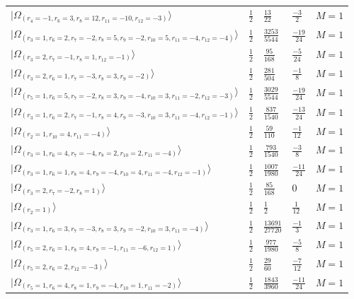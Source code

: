 \documentclass[11pt,twoside,openright]{book}
\begin{document}
\begin{longtable}{p{4cm}llll}
$|\Omega_{(r_{4}=-1, r_{6}=3, r_{8}=12, r_{11}=-10, r_{12}=-3)}\rangle$ & $\frac{1}{2}$ & $\frac{13}{22}$ & $\frac{-3}{2}$ & $M=1$ \\
$|\Omega_{(r_{3}=1, r_{6}=2, r_{7}=-2, r_{8}=5, r_{9}=-2, r_{10}=5, r_{11}=-4, r_{12}=-4)}\rangle$ & $\frac{1}{2}$ & $\frac{3253}{5544}$ & $\frac{-19}{24}$ & $M=1$ \\
$|\Omega_{(r_{3}=2, r_{7}=-1, r_{8}=1, r_{12}=-1)}\rangle$ & $\frac{1}{2}$ & $\frac{95}{168}$ & $\frac{-5}{24}$ & $M=1$ \\
$|\Omega_{(r_{3}=2, r_{6}=1, r_{7}=-3, r_{8}=3, r_{9}=-2)}\rangle$ & $\frac{1}{2}$ & $\frac{281}{504}$ & $\frac{-1}{8}$ & $M=1$ \\
$|\Omega_{(r_{5}=1, r_{6}=5, r_{7}=-2, r_{8}=3, r_{9}=-4, r_{10}=3, r_{11}=-2, r_{12}=-3)}\rangle$ & $\frac{1}{2}$ & $\frac{3029}{5544}$ & $\frac{-19}{24}$ & $M=1$ \\
$|\Omega_{(r_{3}=1, r_{6}=2, r_{7}=-1, r_{8}=4, r_{9}=-3, r_{10}=3, r_{11}=-4, r_{12}=-1)}\rangle$ & $\frac{1}{2}$ & $\frac{837}{1540}$ & $\frac{-13}{24}$ & $M=1$ \\
$|\Omega_{(r_{2}=1, r_{10}=4, r_{11}=-4)}\rangle$ & $\frac{1}{2}$ & $\frac{59}{110}$ & $\frac{-1}{12}$ & $M=1$ \\
$|\Omega_{(r_{3}=1, r_{6}=4, r_{7}=-4, r_{8}=2, r_{10}=2, r_{11}=-4)}\rangle$ & $\frac{1}{2}$ & $\frac{793}{1540}$ & $\frac{-3}{8}$ & $M=1$ \\
$|\Omega_{(r_{3}=1, r_{6}=1, r_{8}=4, r_{9}=-4, r_{10}=4, r_{11}=-4, r_{12}=-1)}\rangle$ & $\frac{1}{2}$ & $\frac{1007}{1980}$ & $\frac{-11}{24}$ & $M=1$ \\
$|\Omega_{(r_{3}=2, r_{7}=-2, r_{8}=1)}\rangle$ & $\frac{1}{2}$ & $\frac{85}{168}$ & $0$ & $M=1$ \\
$|Ω_(r_2=1)⟩$ & $\frac{1}{2}$ & $\frac{1}{2}$ & $\frac{1}{12}$ & $M=1$ \\
$|\Omega_{(r_{3}=1, r_{6}=3, r_{7}=-3, r_{8}=3, r_{9}=-2, r_{10}=3, r_{11}=-4)}\rangle$ & $\frac{1}{2}$ & $\frac{13691}{27720}$ & $\frac{-1}{3}$ & $M=1$ \\
$|\Omega_{(r_{5}=2, r_{6}=1, r_{8}=4, r_{9}=-1, r_{11}=-6, r_{12}=1)}\rangle$ & $\frac{1}{2}$ & $\frac{977}{1980}$ & $\frac{-5}{8}$ & $M=1$ \\
$|\Omega_{(r_{5}=2, r_{6}=2, r_{12}=-3)}\rangle$ & $\frac{1}{2}$ & $\frac{29}{60}$ & $\frac{-7}{12}$ & $M=1$ \\
$|\Omega_{(r_{5}=1, r_{6}=4, r_{8}=1, r_{9}=-4, r_{10}=1, r_{11}=-2)}\rangle$ & $\frac{1}{2}$ & $\frac{1843}{3960}$ & $\frac{-11}{24}$ & $M=1$ \\

\end{longtable}
\end{document}
